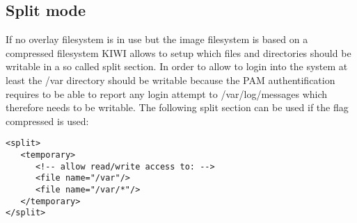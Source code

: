 \subsection{Split mode}

If no overlay filesystem is in use but the image filesystem is based on
a compressed filesystem KIWI allows to setup which files and directories
should be writable in a so called split section. In order to allow to
login into the system at least the /var directory should be writable
because the PAM authentification requires to be able to report any login
attempt to /var/log/messages which therefore needs to be writable. The
following split section can be used if the flag compressed
is used:  

\begin{Command}{12cm}
\begin{verbatim}
<split>
   <temporary>
      <!-- allow read/write access to: -->
      <file name="/var"/>
      <file name="/var/*"/>
   </temporary>
</split>
\end{verbatim}
\end{Command}
